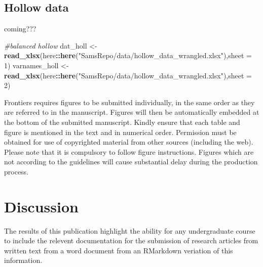 \documentclass[utf8]{frontiersSCNS}
\newenvironment{Shaded}{\begin{snugshade}}{\end{snugshade}}
\newcommand{\CommentTok}[1]{\textcolor[rgb]{0.56,0.35,0.01}{\textit{#1}}}
\newcommand{\DataTypeTok}[1]{\textcolor[rgb]{0.13,0.29,0.53}{#1}}
\newcommand{\DecValTok}[1]{\textcolor[rgb]{0.00,0.00,0.81}{#1}}
\newcommand{\KeywordTok}[1]{\textcolor[rgb]{0.13,0.29,0.53}{\textbf{#1}}}
\newcommand{\NormalTok}[1]{#1}
\newcommand{\OperatorTok}[1]{\textcolor[rgb]{0.81,0.36,0.00}{\textbf{#1}}}
\newcommand{\StringTok}[1]{\textcolor[rgb]{0.31,0.60,0.02}{#1}}
\begin{document}
\begin{Shaded}
\end{Shaded}

\hypertarget{hollow-data}{%
\subsection*{Hollow data}\label{hollow-data}}

coming???

\begin{Shaded}
\begin{Highlighting}[]
\CommentTok{#balanced hollow}
\NormalTok{dat_holl <-}\StringTok{ }\KeywordTok{read_xlsx}\NormalTok{(here}\OperatorTok{::}\KeywordTok{here}\NormalTok{(}\StringTok{"SamsRepo/data/hollow_data_wrangled.xlsx"}\NormalTok{),}\DataTypeTok{sheet =} \DecValTok{1}\NormalTok{)}
\NormalTok{varnames_holl <-}\StringTok{ }\KeywordTok{read_xlsx}\NormalTok{(here}\OperatorTok{::}\KeywordTok{here}\NormalTok{(}\StringTok{"SamsRepo/data/hollow_data_wrangled.xlsx"}\NormalTok{),}\DataTypeTok{sheet =} \DecValTok{2}\NormalTok{)}
\end{Highlighting}
\end{Shaded}

Frontiers requires figures to be submitted individually, in the same
order as they are referred to in the manuscript. Figures will then be
automatically embedded at the bottom of the submitted manuscript. Kindly
ensure that each table and figure is mentioned in the text and in
numerical order. Permission must be obtained for use of copyrighted
material from other sources (including the web). Please note that it is
compulsory to follow figure instructions. Figures which are not
according to the guidelines will cause substantial delay during the
production process.

\hypertarget{discussion}{%
\section{Discussion}\label{discussion}}

The results of this publication highlight the ability for any
undergraduate course to include the relevent documentation for the
submission of research articles from written text from a word document
from an RMarkdown veriation of this information.
\end{document}
